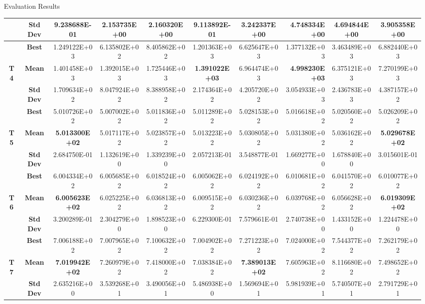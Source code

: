 \documentclass[table]{beamer}
\begin{document}
\begin{frame}{Evaluation Results}
\begin{table}[htbp]
{\begin{tabular}{|c|c|c|c|c|c|c|r|c|c|}
		\multicolumn{ 1}{|c|}{} & \textbf{Std Dev} & 9.238688E-01 & 2.153735E+00 & 2.160320E+00 & 9.113892E-01 & 3.242337E+00 & 4.748334E+00 & 4.694844E+00 & 3.905358E+00 \\ \hline
		\multicolumn{ 1}{|c|}{} & \textbf{Best} & 1.249122E+03 & 6.135802E+02 & 8.405862E+02 & 1.201363E+03 & 6.625647E+03 & 1.377132E+03 & 3.463489E+03 & 6.882440E+03 \\ \cline{ 2- 10}
		\multicolumn{ 1}{|c|}{\textbf{T4}} & \textbf{Mean} & 1.401458E+03 & 1.392015E+03 & 1.725446E+03 & \textbf{1.391022E+03} & 6.964474E+03 & \textbf{4.998230E+03} & 6.375121E+03 & 7.270199E+03 \\ \cline{ 2- 10}
		\multicolumn{ 1}{|c|}{} & \textbf{Std Dev} & 1.709634E+02 & 8.047924E+02 & 8.388958E+02 & 2.174364E+02 & 4.205720E+02 & 3.054933E+03 & 2.436783E+03 & 4.387157E+02 \\ \hline
		\multicolumn{ 1}{|c|}{} & \textbf{Best} & 5.010726E+02 & 5.007002E+02 & 5.011836E+02 & 5.011289E+02 & 5.028153E+02 & 5.016618E+02 & 5.020560E+02 & 5.026209E+02 \\ \cline{ 2- 10}
		\multicolumn{ 1}{|c|}{\textbf{T5}} & \textbf{Mean} & \textbf{5.013300E+02} & 5.017117E+02 & 5.023857E+02 & 5.013223E+02 & 5.030805E+02 & 5.031380E+02 & 5.036162E+02 & \textbf{5.029678E+02} \\ \cline{ 2- 10}
		\multicolumn{ 1}{|c|}{} & \textbf{Std Dev} & 2.684750E-01 & 1.132619E+00 & 1.339239E+00 & 2.057213E-01 & 3.548877E-01 & 1.669277E+00 & 1.678840E+00 & 3.015601E-01 \\ \hline
		\multicolumn{ 1}{|c|}{} & \textbf{Best} & 6.004334E+02 & 6.005685E+02 & 6.018524E+02 & 6.005062E+02 & 6.024192E+02 & 6.010681E+02 & 6.041570E+02 & 6.010077E+02 \\ \cline{ 2- 10}
		\multicolumn{ 1}{|c|}{\textbf{T6}} & \textbf{Mean} & \textbf{6.005623E+02} & 6.025225E+02 & 6.036813E+02 & 6.009515E+02 & 6.030236E+02 & 6.039768E+02 & 6.056628E+02 & \textbf{6.019309E+02} \\ \cline{ 2- 10}
		\multicolumn{ 1}{|c|}{} & \textbf{Std Dev} & 3.200289E-01 & 2.304279E+00 & 1.898523E+00 & 6.229300E-01 & 7.579661E-01 & 2.740738E+00 & 1.433152E+00 & 1.224478E+00 \\ \hline
		\multicolumn{ 1}{|c|}{} & \textbf{Best} & 7.006188E+02 & 7.007965E+02 & 7.100632E+02 & 7.004902E+02 & 7.271223E+02 & 7.024000E+02 & 7.544377E+02 & 7.262179E+02 \\ \cline{ 2- 10}
		\multicolumn{ 1}{|c|}{\textbf{T7}} & \textbf{Mean} & \textbf{7.019942E+02} & 7.260979E+02 & 7.418000E+02 & 7.038384E+02 & \textbf{7.389013E+02} & 7.605963E+02 & 8.116680E+02 & 7.498652E+02 \\ \cline{ 2- 10}
		\multicolumn{ 1}{|c|}{} & \textbf{Std Dev} & 2.635216E+00 & 3.539268E+01 & 3.490056E+01 & 5.486938E+00 & 1.569694E+01 & 5.981939E+01 & 5.740507E+01 & 2.791729E+01 \\ \hline
	\end{tabular}}
	\label{}
\end{table}

	\end{frame}
\end{document}
